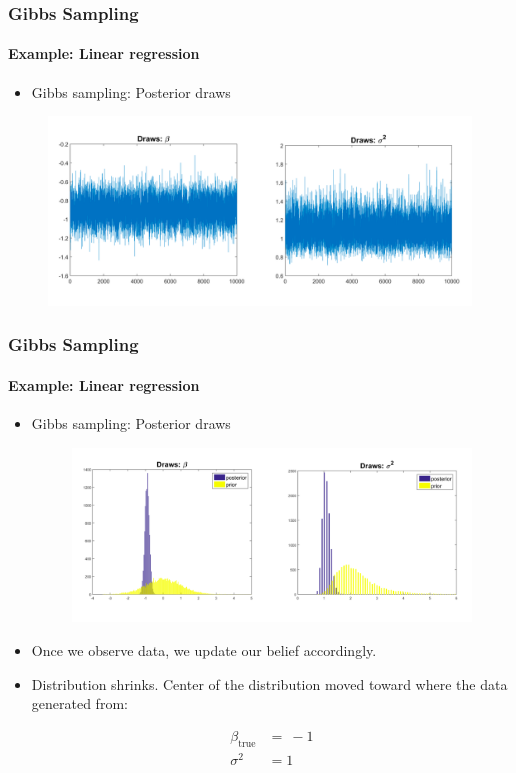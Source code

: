 \documentclass[
  shownotes,
  xcolor={svgnames},
  hyperref={colorlinks,citecolor=DarkBlue,linkcolor=DarkRed,urlcolor=DarkBlue}
  , aspectratio=169]{beamer}
\begin{document}
\begin{frame}[fragile,t]
\frametitle{Gibbs Sampling} 
\framesubtitle{Example: Linear regression}

\begin{itemize}
\item Gibbs sampling: Posterior draws
\end{itemize}
  

\begin{figure}[H] \centering
  \centering
  \includegraphics[scale=0.45]{figures/fig1_gibbs}
  \\
  \tiny 
\end{figure}
   \end{frame}
\begin{frame}[fragile]
\frametitle{Gibbs Sampling} 
\framesubtitle{Example: Linear regression}

\begin{itemize}
\item Gibbs sampling: Posterior draws



  
\begin{figure}[H] \centering
  \centering
  \includegraphics[scale=0.45]{figures/fig2_gibbs}
  \\
  \tiny 
\end{figure}

\footnotesize
\item Once we observe data, we update our belief accordingly.

\item Distribution shrinks. Center of the distribution moved toward where the data generated from:

\begin{align}
\beta_{\text{true}} &= \  - 1 \\
\sigma^{2} &= 1
\end{align}

\end{itemize}
 \end{frame}
\end{document}
